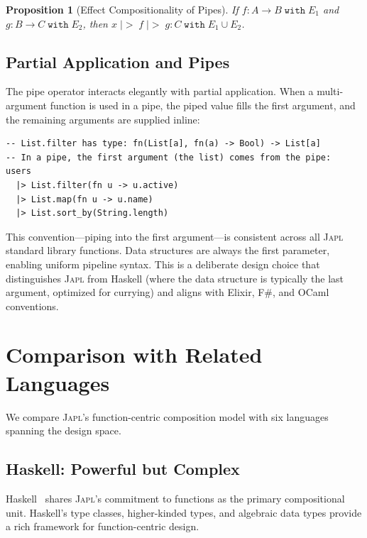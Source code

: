 \documentclass[11pt,a4paper]{article}
\newtheorem{proposition}[theorem]{Proposition}
\newcommand{\japl}{\textsc{Japl}}
\newcommand{\pipe}{\;|\!>\;}
\begin{document}
\begin{proposition}[Effect Compositionality of Pipes]
If $f : A \to B \;\texttt{with}\; E_1$ and $g : B \to C \;\texttt{with}\; E_2$, then $x \pipe f \pipe g : C \;\texttt{with}\; E_1 \cup E_2$.
\end{proposition}

\subsection{Partial Application and Pipes}

The pipe operator interacts elegantly with partial application. When a multi-argument function is used in a pipe, the piped value fills the first argument, and the remaining arguments are supplied inline:

\begin{lstlisting}
-- List.filter has type: fn(List[a], fn(a) -> Bool) -> List[a]
-- In a pipe, the first argument (the list) comes from the pipe:
users
  |> List.filter(fn u -> u.active)
  |> List.map(fn u -> u.name)
  |> List.sort_by(String.length)
\end{lstlisting}

This convention---piping into the first argument---is consistent across all \japl{} standard library functions. Data structures are always the first parameter, enabling uniform pipeline syntax. This is a deliberate design choice that distinguishes \japl{} from Haskell (where the data structure is typically the last argument, optimized for currying) and aligns with Elixir, F\#, and OCaml conventions.


\section{Comparison with Related Languages}
\label{sec:comparison}

We compare \japl{}'s function-centric composition model with six languages spanning the design space.

\subsection{Haskell: Powerful but Complex}

Haskell~\citep{peyton2003haskell} shares \japl{}'s commitment to functions as the primary compositional unit. Haskell's type classes, higher-kinded types, and algebraic data types provide a rich framework for function-centric design.
\end{document}
